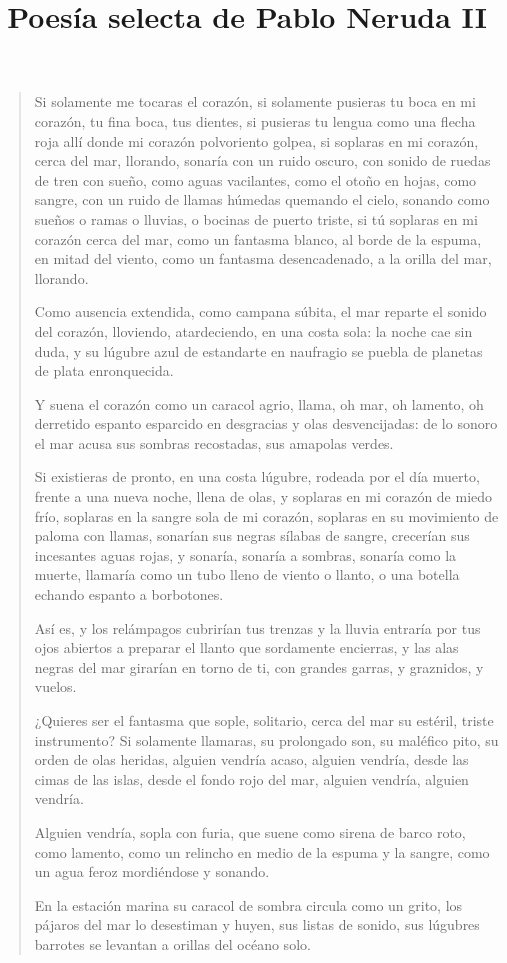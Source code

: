 \documentclass[12pt]{article}
\date{}
\title{Poesía selecta de Pablo Neruda II}
\begin{document}
\maketitle
\tableofcontents

\clearpage
{}
\begin{verse}
Si solamente me tocaras el corazón,  
si solamente pusieras tu boca en mi corazón,  
tu fina boca, tus dientes,  
si pusieras tu lengua como una flecha roja  
allí donde mi corazón polvoriento golpea,  
si soplaras en mi corazón, cerca del mar, llorando,  
sonaría con un ruido oscuro, con sonido de ruedas de tren con sueño,  
como aguas vacilantes,  
como el otoño en hojas,  
como sangre,  
con un ruido de llamas húmedas quemando el cielo,  
sonando como sueños o ramas o lluvias,  
o bocinas de puerto triste,  
si tú soplaras en mi corazón cerca del mar,  
como un fantasma blanco,  
al borde de la espuma,  
en mitad del viento,  
como un fantasma desencadenado, a la orilla del mar, llorando.  
	
Como ausencia extendida, como campana súbita,  
el mar reparte el sonido del corazón,  
lloviendo, atardeciendo, en una costa sola:  
la noche cae sin duda,  
y su lúgubre azul de estandarte en naufragio  
se puebla de planetas de plata enronquecida.  
	
Y suena el corazón como un caracol agrio,  
llama, oh mar, oh lamento, oh derretido espanto  
esparcido en desgracias y olas desvencijadas:  
de lo sonoro el mar acusa  
sus sombras recostadas, sus amapolas verdes.  
	
Si existieras de pronto, en una costa lúgubre,  
rodeada por el día muerto,  
frente a una nueva noche,  
llena de olas,  
y soplaras en mi corazón de miedo frío,  
soplaras en la sangre sola de mi corazón,  
soplaras en su movimiento de paloma con llamas,  
sonarían sus negras sílabas de sangre,  
crecerían sus incesantes aguas rojas,  
y sonaría, sonaría a sombras,  
sonaría como la muerte,  
llamaría como un tubo lleno de viento o llanto,  
o una botella echando espanto a borbotones.  
	
Así es, y los relámpagos cubrirían tus trenzas  
y la lluvia entraría por tus ojos abiertos  
a preparar el llanto que sordamente encierras,  
y las alas negras del mar girarían en torno  
de ti, con grandes garras, y graznidos, y vuelos.  
	
¿Quieres ser el fantasma que sople, solitario,  
cerca del mar su estéril, triste instrumento?  
Si solamente llamaras,  
su prolongado son, su maléfico pito,  
su orden de olas heridas,  
alguien vendría acaso,  
alguien vendría,  
desde las cimas de las islas, desde el fondo rojo del mar,  
alguien vendría, alguien vendría.  
	
Alguien vendría, sopla con furia,  
que suene como sirena de barco roto,  
como lamento,  
como un relincho en medio de la espuma y la sangre,  
como un agua feroz mordiéndose y sonando.  
	
En la estación marina  
su caracol de sombra circula como un grito,  
los pájaros del mar lo desestiman y huyen,  
sus listas de sonido, sus lúgubres barrotes  
se levantan a orillas del océano solo.  

\end{verse}
\end{document}
